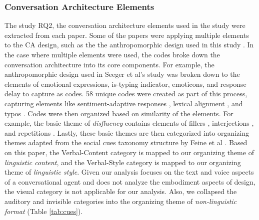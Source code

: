 \documentclass[sigconf,screen,review, anonymous]{acmart}
\newcommand{\cmt}[1]{}%
\begin{document}
\subsubsection*{Conversation Architecture Elements}
The study RQ2, the conversation architecture elements used in the study were extracted from each paper. Some of the papers were applying multiple elements to the CA design, such as the the anthropomorphic design used in this study \cite{seeger2021chatbots}\cmt{[35]}. In the case where multiple elements were used, the codes broke down the conversation architecture into its core components. For example, the anthropomorphic design used in Seeger et al's study \cite{seeger2021chatbots}\cmt{[35]} was broken down to the elements of emotional expressions, is-typing indicator, emoticons, and response delay to capture as codes. 58 unique codes were created as part of this process, capturing elements like sentiment-adaptive responses \cite{diederich2019emulating}\cmt{[25]}, lexical alignment \cite{spillner2021talk}\cmt{[18]}, and typos \cite{westerman2019believe}\cmt{[9]}. Codes were then organized based on similarity of the elements. For example, the basic theme of \textit{disfluency} contains elements of fillers \cite{jeong2019exploring}\cmt{[10]}\cite{wester2015artificial}\cmt{[14]}, interjections \cite{ceha2022expressive}\cmt{[77]}\cite{hu2021enhancing}\cmt{[56]}, and repetitions \cite{yang2021effect}\cmt{[72]}. Lastly, these basic themes are then categorized into organizing themes adapted from the social cues taxonomy structure by Feine et al \cite{feine2019taxonomy}. Based on this paper, the Verbal-Content category is mapped to our organizing theme of \textit{linguistic content}, and the Verbal-Style category is mapped to our organizing theme of \textit{linguistic style}.
Given our analysis focuses on the text and voice aspects of a conversational agent and does not analyze the embodiment aspects of design, the visual category is not applicable for our analysis. Also, we collapsed the auditory and invisible categories into the organizing theme of \textit{non-linguistic format} (Table \ref{tab:cues}).
\end{document}
